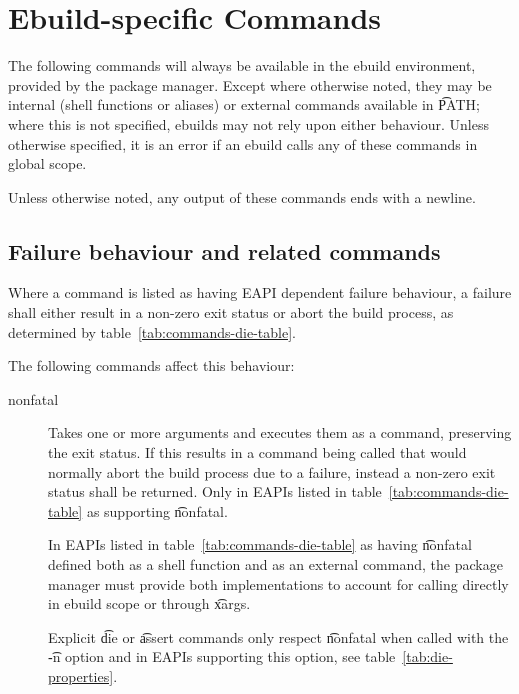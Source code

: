 \section{Ebuild-specific Commands}
\label{sec:pkg-mgr-commands}

The following commands will always be available in the ebuild environment, provided by the package
manager. Except where otherwise noted, they may be internal (shell functions or aliases) or external
commands available in \t{PATH}; where this is not specified, ebuilds may not rely upon either
behaviour. Unless otherwise specified, it is an error if an ebuild calls any of these commands in
global scope.

Unless otherwise noted, any output of these commands ends with a newline.

\subsection{Failure behaviour and related commands}
\label{sec:failure-behaviour}

 Where a command is listed as having EAPI dependent failure behaviour,
a failure shall either result in a non-zero exit status or abort the build process, as determined by
table~\ref{tab:commands-die-table}.

The following commands affect this behaviour:
\nobreakpar
\begin{description}
\item[nonfatal]  Takes one or more arguments and executes them as a command,
    preserving the exit status. If this results in a command being called that would normally abort
    the build process due to a failure, instead a non-zero exit status shall be returned. Only in
    EAPIs listed in table~\ref{tab:commands-die-table} as supporting \t{nonfatal}.

    In EAPIs listed in table~\ref{tab:commands-die-table} as having \t{nonfatal} defined both
    as a shell function and as an external command, the package manager must provide both
    implementations to account for calling directly in ebuild scope or through \t{xargs}.

    Explicit \t{die} or \t{assert} commands only respect \t{nonfatal} when called with the \t{-n}
    option and in EAPIs supporting this option, see table~\ref{tab:die-properties}.
\end{description}

